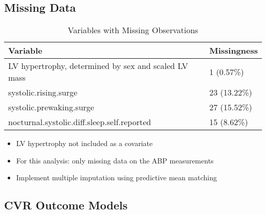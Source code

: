 \documentclass[10pt]{article}\usepackage[]{graphicx}\usepackage[]{color}
\begin{document}
\subsection{Missing Data}
\begin{table}[ht]
\centering
\caption{Variables with Missing Observations} 
\begin{tabular}{ll}
  \hline
Variable & Missingness \\ 
  \hline
LV hypertrophy, determined by sex and scaled LV mass & 1 (0.57\%) \\ 
  systolic.rising.surge & 23 (13.22\%) \\ 
  systolic.prewaking.surge & 27 (15.52\%) \\ 
  nocturnal.systolic.diff.sleep.self.reported & 15 (8.62\%) \\ 
   \hline
\end{tabular}
\end{table}


\begin{itemize}
  \item LV hypertrophy not included as a covariate
  \item For this analysis: only missing data on the ABP measurements
  \item Implement multiple imputation using predictive mean matching
\end{itemize}




\subsection{CVR Outcome Models}
\end{document}
